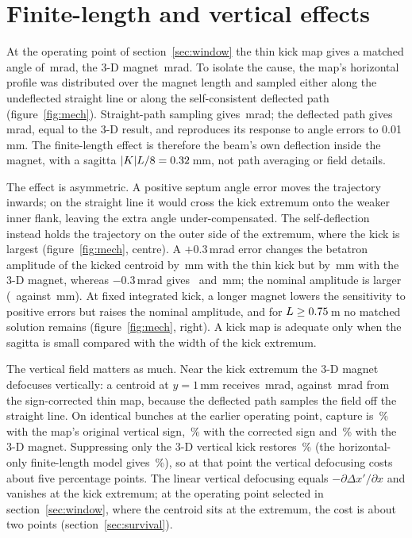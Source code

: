 \documentclass[a4paper,11pt]{article}
\begin{document}
\section{Finite-length and vertical effects}
\label{sec:mechanism}

At the operating point of section~\ref{sec:window} the thin kick map gives a matched angle of \MatchThinMrad\,mrad, the 3-D magnet \MatchThreeDMrad\,mrad. To isolate the cause, the map's horizontal profile was distributed over the magnet length and sampled either along the undeflected straight line or along the self-consistent deflected path (figure~\ref{fig:mech}). Straight-path sampling gives \MatchStraightMrad\,mrad; the deflected path gives \MatchBentMrad\,mrad, equal to the 3-D result, and reproduces its response to angle errors to 0.01\,mm. The finite-length effect is therefore the beam's own deflection inside the magnet, with a sagitta $|K|L/8=0.32$\,mm, not path averaging or field details.

The effect is asymmetric. A positive septum angle error moves the trajectory inwards; on the straight line it would cross the kick extremum onto the weaker inner flank, leaving the extra angle under-compensated. The self-deflection instead holds the trajectory on the outer side of the extremum, where the kick is largest (figure~\ref{fig:mech}, centre). A $+0.3$\,mrad error changes the betatron amplitude of the kicked centroid by \AmpThinPlus\,mm with the thin kick but by \AmpThreeDPlus\,mm with the 3-D magnet, whereas $-0.3$\,mrad gives \AmpThinMinus\ and \AmpThreeDMinus\,mm; the nominal amplitude is larger (\AmpThreeDNom\ against \AmpThinNom\,mm). At fixed integrated kick, a longer magnet lowers the sensitivity to positive errors but raises the nominal amplitude, and for $L\geq0.75$\,m no matched solution remains (figure~\ref{fig:mech}, right). A kick map is adequate only when the sagitta is small compared with the width of the kick extremum.

The vertical field matters as much. Near the kick extremum the 3-D magnet defocuses vertically: a centroid at $y=1$\,mm receives \VertKickThreeD\,mrad, against \VertKickThin\,mrad from the sign-corrected thin map, because the deflected path samples the field off the straight line. On identical bunches at the earlier operating point, capture is \CapThinLegacy\,\% with the map's original vertical sign, \CapThinPhys\,\% with the corrected sign and \CapThreeDRematch\,\% with the 3-D magnet. Suppressing only the 3-D vertical kick restores \CapThreeDNoVert\,\% (the horizontal-only finite-length model gives \CapThickOneD\,\%), so at that point the vertical defocusing costs about five percentage points. The linear vertical defocusing equals $-\partial\Delta x'/\partial x$ and vanishes at the kick extremum; at the operating point selected in section~\ref{sec:window}, where the centroid sits at the extremum, the cost is about two points (section~\ref{sec:survival}).
\end{document}

